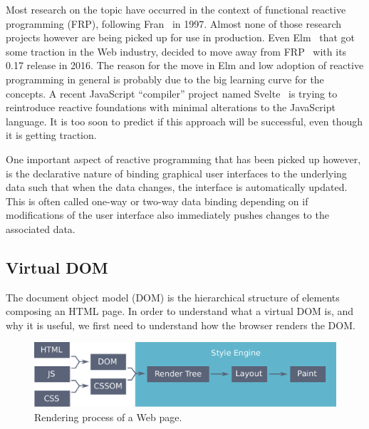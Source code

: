 Most research on the topic have occurred in the context
of functional reactive programming (FRP), following Fran~\cite{elliott1997functional} in 1997.
Almost none of those research projects however are being
picked up for use in production.
Even Elm~\cite{czaplicki2013asynchronous} that got some traction in the Web industry,
decided to move away from FRP~\cite{elm017farewell} with its 0.17 release in 2016.
The reason for the move in Elm and low adoption of reactive programming in general
is probably due to the big learning curve for the concepts.
A recent JavaScript ``compiler'' project named Svelte~\cite{harrissvelte}
is trying to reintroduce reactive foundations with minimal alterations
to the JavaScript language.
It is too soon to predict if this approach will be successful,
even though it is getting traction.

One important aspect of reactive programming that has been picked up however,
is the declarative nature of binding graphical user interfaces to the
underlying data such that when the data changes, the interface is automatically updated.
This is often called one-way or two-way data binding depending on if
modifications of the user interface also immediately pushes changes to the associated data.


\subsection{Virtual DOM}%
\label{sub:virtual_dom}

The document object model (DOM) is the hierarchical structure of elements
composing an HTML page.
In order to understand what a virtual DOM is, and why it is useful,
we first need to understand how the browser renders the DOM.

\begin{figure}[ht]
\includegraphics[width=\columnwidth]{assets/img/dom-rendering.pdf}
\caption{Rendering process of a Web page.}%
\label{fig:dom-rendering}
\end{figure}

